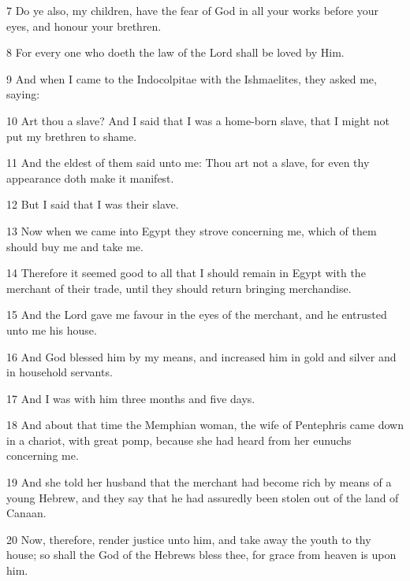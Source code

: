 \par 7 Do ye also, my children, have the fear of God in all your works before your eyes, and honour your brethren.

\par 8 For every one who doeth the law of the Lord shall be loved by Him.

\par 9 And when I came to the Indocolpitae with the Ishmaelites, they asked me, saying:

\par 10 Art thou a slave? And I said that I was a home-born slave, that I might not put my brethren to shame.

\par 11 And the eldest of them said unto me: Thou art not a slave, for even thy appearance doth make it manifest.

\par 12 But I said that I was their slave.

\par 13 Now when we came into Egypt they strove concerning me, which of them should buy me and take me.

\par 14 Therefore it seemed good to all that I should remain in Egypt with the merchant of their trade, until they should return bringing merchandise.

\par 15 And the Lord gave me favour in the eyes of the merchant, and he entrusted unto me his house.

\par 16 And God blessed him by my means, and increased him in gold and silver and in household servants.

\par 17 And I was with him three months and five days.

\par 18 And about that time the Memphian woman, the wife of Pentephris came down in a chariot, with great pomp, because she had heard from her eunuchs concerning me.

\par 19 And she told her husband that the merchant had become rich by means of a young Hebrew, and they say that he had assuredly been stolen out of the land of Canaan.

\par 20 Now, therefore, render justice unto him, and take away the youth to thy house; so shall the God of the Hebrews bless thee, for grace from heaven is upon him.

